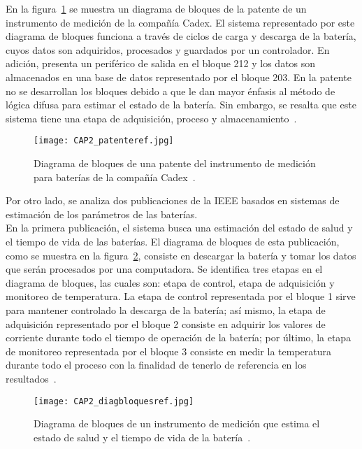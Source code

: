 En la figura~\ref{fig:patenteref} se muestra un diagrama de bloques de la patente de un instrumento de medición de la compañía Cadex. El sistema representado por este diagrama de bloques funciona a través de ciclos de carga y descarga de la batería, cuyos datos son adquiridos, procesados y guardados por un controlador. En adición, presenta un periférico de salida en el bloque 212 y los datos son almacenados en una base de datos representado por el bloque 203. En la patente no se desarrollan los bloques debido a que le dan mayor énfasis al método de lógica difusa para estimar el estado de la batería. Sin embargo, se resalta que este sistema tiene una etapa de adquisición, proceso y almacenamiento~\cite{Tinnemeyer}. \\

\begin{figure}[!ht]
\begin{center}
\texttt{[image: CAP2\_patenteref.jpg]}
\caption{Diagrama de bloques de una patente del instrumento de medición para baterías de la compañía Cadex~\cite{Tinnemeyer}.}
\label{fig:patenteref}
\end{center}
\end{figure}

Por otro lado, se analiza dos publicaciones de la IEEE basados en sistemas de estimación de los parámetros de las baterías. \\

En la primera publicación, el sistema busca una estimación del estado de salud y el tiempo de vida de las baterías. El diagrama de bloques de esta publicación, como se muestra en la figura~\ref{fig:diagbloquesref}, consiste en descargar la batería y tomar los datos que serán procesados por una computadora. Se identifica tres etapas en el diagrama de bloques, las cuales son: etapa de control, etapa de adquisición y monitoreo de temperatura. La etapa de control representada por el bloque 1 sirve para mantener controlado la descarga de la batería; así mismo, la etapa de adquisición representado por el bloque 2 consiste en adquirir los valores de corriente durante todo el tiempo de operación de la batería; por último, la etapa de monitoreo representada por el bloque 3 consiste en medir la temperatura durante todo el proceso con la finalidad de tenerlo de referencia en los resultados~\cite{Harris2015}. \\

\begin{figure}[!ht]
\begin{center}
\texttt{[image: CAP2\_diagbloquesref.jpg]}
\caption{Diagrama de bloques de un instrumento de medición que estima el estado de salud y el tiempo de vida de la batería~\cite{Harris2015}.}
\label{fig:diagbloquesref}
\end{center}
\end{figure}


